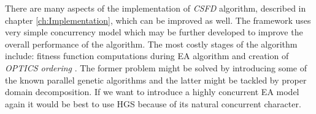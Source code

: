 There are many aspects of the implementation of \textit{CSFD} algorithm,
described in chapter \ref{ch:Implementation}, which can be improved as well. The
framework uses very simple concurrency model which may be further developed to improve the overall performance of the algorithm.
The most costly stages of the algorithm include: fitness function computations
during EA algorithm and creation of \textit{OPTICS ordering} \cite{optics}.
The former problem might be solved by introducing some of the known
parallel genetic algorithms and the latter might be tackled by proper
domain decomposition. If we want to introduce a highly concurrent EA model
again it would be best to use HGS because of its natural concurrent character.
